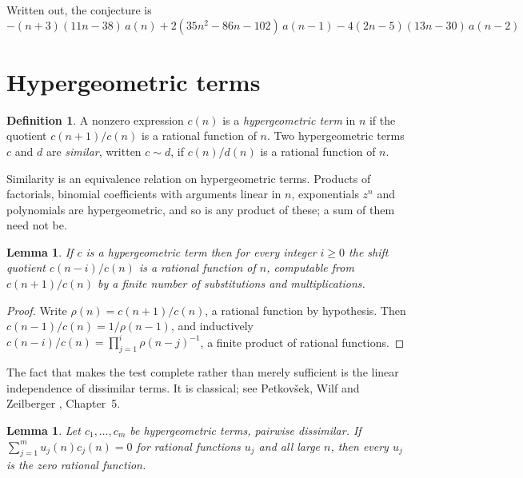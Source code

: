 \documentclass[11pt,a4paper]{article}
\theoremstyle{plain}
\newtheorem{lemma}[theorem]{Lemma}
\theoremstyle{definition}
\newtheorem{definition}[theorem]{Definition}
\begin{document}
Written out, the conjecture is
\begin{equation}\label{eq:conj}
- \left(n + 3\right) \left(11 n - 38\right)\,a(n) + 2 \left(35 n^{2} - 86 n - 102\right)\,a(n-1) -  4 \left(2 n - 5\right) \left(13 n - 30\right)\,a(n-2)
\end{equation}

\section{Hypergeometric terms}

\begin{definition}
A nonzero expression $c(n)$ is a \emph{hypergeometric term} in $n$ if the quotient
$c(n+1)/c(n)$ is a rational function of $n$. Two hypergeometric terms $c$ and $d$ are
\emph{similar}, written $c\sim d$, if $c(n)/d(n)$ is a rational function of $n$.
\end{definition}

Similarity is an equivalence relation on hypergeometric terms. Products of factorials,
binomial coefficients with arguments linear in $n$, exponentials $z^{n}$ and polynomials
are hypergeometric, and so is any product of these; a sum of them need not be.

\begin{lemma}\label{lem:shift}
If $c$ is a hypergeometric term then for every integer $i\ge 0$ the shift quotient
$c(n-i)/c(n)$ is a rational function of $n$, computable from $c(n+1)/c(n)$ by a finite
number of substitutions and multiplications.
\end{lemma}

\begin{proof}
Write $\rho(n)=c(n+1)/c(n)$, a rational function by hypothesis. Then
$c(n-1)/c(n)=1/\rho(n-1)$, and inductively
$c(n-i)/c(n)=\prod_{j=1}^{i}\rho(n-j)^{-1}$, a finite product of rational functions.
\end{proof}

The fact that makes the test complete rather than merely sufficient is the linear
independence of dissimilar terms. It is classical; see Petkov\v{s}ek, Wilf and Zeilberger
\cite{AB}, Chapter~5.

\begin{lemma}\label{lem:indep}
Let $c_{1},\dots,c_{m}$ be hypergeometric terms, pairwise dissimilar. If
$\sum_{j=1}^{m}u_{j}(n)c_{j}(n)=0$ for rational functions $u_{j}$ and all large $n$, then
every $u_{j}$ is the zero rational function.
\end{lemma}
\end{document}
